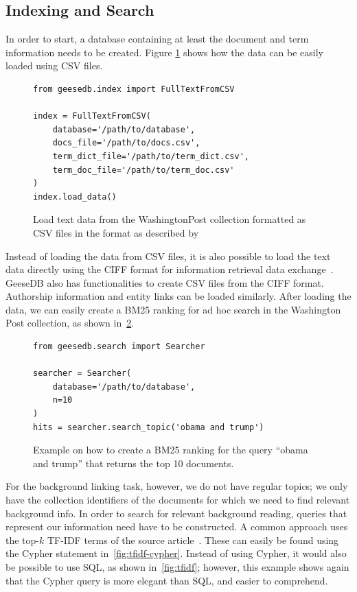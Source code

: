 \subsection{Indexing and Search}
In order to start, a database containing at least the document and term information needs to be created. Figure \ref{fig:load_text_data} shows how the data can be easily loaded using CSV files.
\begin{figure}
	\begin{verbatim}
from geesedb.index import FullTextFromCSV

index = FullTextFromCSV(
    database='/path/to/database',
    docs_file='/path/to/docs.csv',
    term_dict_file='/path/to/term_dict.csv',
    term_doc_file='/path/to/term_doc.csv'
)
index.load_data()
	\end{verbatim}
	\caption{Load text data from the WashingtonPost collection formatted as CSV files in the format as described by~\citet{OldDog}}
	\label{fig:load_text_data}
\end{figure}

Instead of loading the data from CSV files, it is also possible to load the text data directly using the CIFF format for information retrieval data exchange~\citep{ciff}. GeeseDB also has functionalities to create CSV files from the CIFF format. Authorship information and entity links can be loaded similarly. After loading the data, we can easily create a BM25 ranking for ad hoc search in the Washington Post collection, as shown in~\cref{fig:code_bm25_ranking}.

\begin{figure}
	\begin{verbatim}
from geesedb.search import Searcher

searcher = Searcher(
    database='/path/to/database', 
    n=10
)
hits = searcher.search_topic('obama and trump')
	\end{verbatim}
	\caption{Example on how to create a BM25 ranking for the query ``obama and trump'' that returns the top 10 documents.}
	\label{fig:code_bm25_ranking}
\end{figure}

For the background linking task, however, we do not have regular topics; we only have the collection identifiers of the documents for which we need to find relevant background info. In order to search for relevant background reading, queries that represent our information need have to be constructed. A common approach uses the top-$k$ TF-IDF terms of the source article~\citep{anserini-news}. These can easily be found using the Cypher statement in~\cref{fig:tfidf-cypher}. Instead of using Cypher, it would also be possible to use SQL, as shown in~\cref{fig:tfidf}; however, this example shows again that the Cypher query is more elegant than SQL, and easier to comprehend. 

